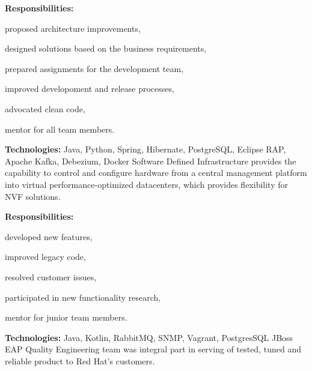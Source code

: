 \documentclass[a4paper]{deedy-resume}
\begin{document}
\vspace{4pt}
\textbf{Responsibilities:}
\begin{tightitemize}
    \item proposed architecture improvements,
    \item designed solutions based on the business requirements,
    \item prepared assignments for the development team,
    \item improved developoment and release processes,
    \item advocated clean code,
    \item mentor for all team members.
\end{tightitemize}
\vspace{\topsep}
\footnotesize\textbf{Technologies:} Java, Python, Spring, Hibernate, PostgreSQL, Eclipse RAP, Apache Kafka, Debezium, Docker
\normalsize
\sectionspace
\newline
Software Defined Infrastructure provides the capability to control and configure hardware from a central management platform into virtual performance-optimized datacenters, which provides flexibility for NVF solutions.

\vspace{4pt}
\textbf{Responsibilities:}
\begin{tightitemize}
    \item developed new features,
    \item improved legacy code,
    \item resolved customer issues,
    \item participated in new functionality research,
    \item mentor for junior team members.
\end{tightitemize}
\vspace{\topsep}
\footnotesize\textbf{Technologies:} Java, Kotlin, RabbitMQ, SNMP, Vagrant, PostgresSQL
\normalsize
\sectionspace
\newline
JBoss EAP Quality Engineering team was integral part in serving of tested, tuned and reliable product to Red Hat's customers.
\end{document}
